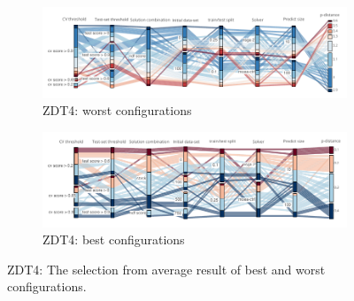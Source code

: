     \begin{figure}
        \centering
        \begin{subfigure}{\textwidth}
            \includegraphics[width=\textwidth]{content/images/conf_zdt4_worst}
            \caption{ZDT4: worst configurations}
            \label{fig:conf_zdt4_worst}
        \end{subfigure} 
        \hfill
        
        \begin{subfigure}{\textwidth}
            \includegraphics[width=\textwidth]{content/images/conf_zdt4_best}
            \caption{ZDT4: best configurations}
            \label{fig:conf_zdt4_best}
        \end{subfigure} 

        \caption[ZDT4: The selection from average result of best and worst configurations.]{ZDT4: The selection from average result of best and worst configurations.}
        \label{fig:conf_zdt4}    
    \end{figure}

